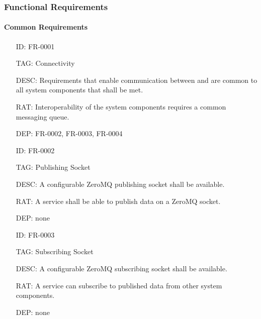     \subsubsection{Functional Requirements}\label{sec:req-srs-func}

      \paragraph{Common Requirements}

        \begin{itemize}
          \setlength{\itemindent}{.5in}
          \itemsep .15em
          \item[ID:] FR-0001
          \item[TAG:] Connectivity
          \item[DESC:] Requirements that enable communication between and are
            common to all system components that shall be met.
          \item[RAT:] Interoperability of the system components requires a
            common messaging queue.
          \item[DEP:] FR-0002, FR-0003, FR-0004
        \end{itemize}

        \begin{itemize}
          \setlength{\itemindent}{.5in}
          \itemsep .15em
          \item[ID:] FR-0002
          \item[TAG:] Publishing Socket
          \item[DESC:] A configurable ZeroMQ publishing socket shall be
            available.
          \item[RAT:] A service shall be able to publish data on a ZeroMQ
            socket.
          \item[DEP:] none
        \end{itemize}

        \newpage

        \begin{itemize}
          \setlength{\itemindent}{.5in}
          \itemsep .15em
          \item[ID:] FR-0003
          \item[TAG:] Subscribing Socket
          \item[DESC:] A configurable ZeroMQ subscribing socket shall be
            available.
          \item[RAT:] A service can subscribe to published data from other
            system components.
          \item[DEP:] none
        \end{itemize}

